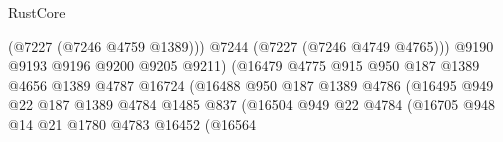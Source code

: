 \begin{lexlean}{RustCore}
\begin{coremodule}
                                                      (@7227 (@7246 @4759 @1389)))
                                                    @7244
                                                    (@7227 (@7246 @4749 @4765)))
                                                  @9190
                                                  @9193
                                                  @9196
                                                  @9200
                                                  @9205
                                                  @9211)
                                                (@16479
                                                  @4775
                                                  @915
                                                  @950
                                                  @187
                                                  @1389
                                                  @4656
                                                  @1389
                                                  @4787
                                                  @16724
                                                  (@16488
                                                    @950
                                                    @187
                                                    @1389
                                                    @4786
                                                    (@16495
                                                      @949
                                                      @22
                                                      @187
                                                      @1389
                                                      @4784
                                                      @1485
                                                      @837
                                                      (@16504
                                                        @949
                                                        @22
                                                        @4784
                                                        (@16705
                                                          @948
                                                          @14
                                                          @21
                                                          @1780
                                                          @4783
                                                          @16452
                                                          (@16564

\end{coremodule}
\end{lexlean}
